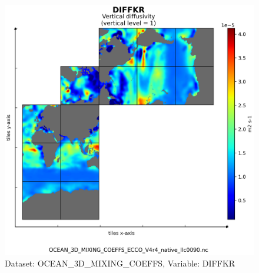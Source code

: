 \begin{figure}[H]
\centering
\includegraphics[scale=0.55]{../images/plots/v4r4/native_plots/Ocean_3D_Gent-Mcwilliams_Redi_and_Background_Vertical_Diffusivity_Coefficients_for_the_Lat-Lon-Cap_90_(llc90)_Native_Model_Grid_(Version_4_Release_4)/DIFFKR.png}
\caption{Dataset: OCEAN\_3D\_MIXING\_COEFFS, Variable: DIFFKR}
\label{tab:table-OCEAN_3D_MIXING_COEFFS_DIFFKR-Plot}
\end{figure}
\newpage
\pagebreak
